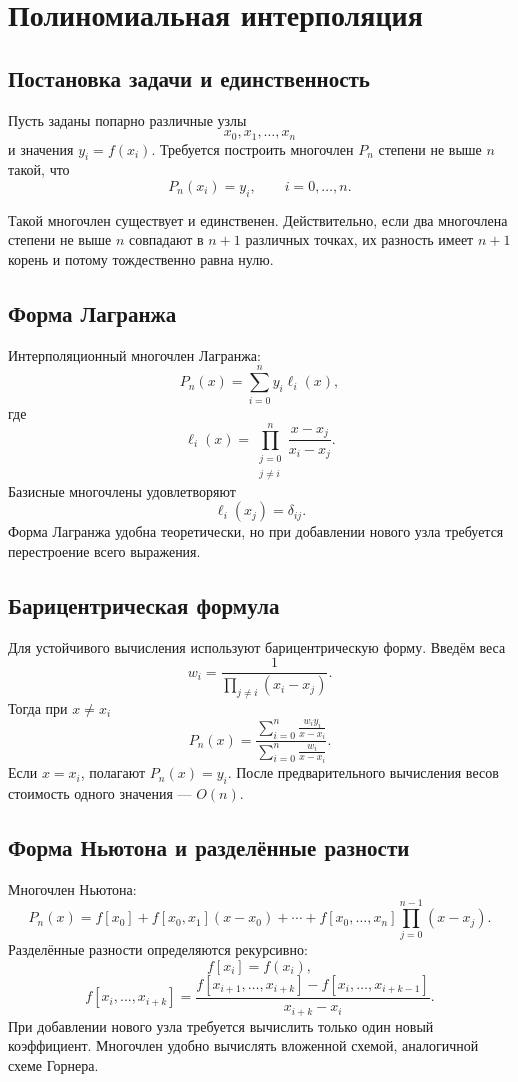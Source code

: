 \section{Полиномиальная интерполяция}
\label{sec:polynomial-interpolation}

\subsection{Постановка задачи и единственность}

Пусть заданы попарно различные узлы
\[
    x_0,x_1,\ldots,x_n
\]
и значения $y_i=f(x_i)$. Требуется построить многочлен $P_n$ степени не выше
$n$ такой, что
\[
    P_n(x_i)=y_i,
    \qquad i=0,\ldots,n.
\]

Такой многочлен существует и единственен. Действительно, если два многочлена
степени не выше $n$ совпадают в $n+1$ различных точках, их разность имеет
$n+1$ корень и потому тождественно равна нулю.

\subsection{Форма Лагранжа}

Интерполяционный многочлен Лагранжа:
\[
    P_n(x)=\sum_{i=0}^{n}y_i\ell_i(x),
\]
где
\[
    \ell_i(x)=
    \prod_{\substack{j=0\\j\neq i}}^{n}
    \frac{x-x_j}{x_i-x_j}.
\]
Базисные многочлены удовлетворяют
\[
    \ell_i(x_j)=\delta_{ij}.
\]
Форма Лагранжа удобна теоретически, но при добавлении нового узла требуется
перестроение всего выражения.

\subsection{Барицентрическая формула}

Для устойчивого вычисления используют барицентрическую форму. Введём веса
\[
    w_i=\frac{1}{\prod_{j\neq i}(x_i-x_j)}.
\]
Тогда при $x\neq x_i$
\[
    P_n(x)=
    \frac{\displaystyle\sum_{i=0}^{n}\frac{w_i y_i}{x-x_i}}
         {\displaystyle\sum_{i=0}^{n}\frac{w_i}{x-x_i}}.
\]
Если $x=x_i$, полагают $P_n(x)=y_i$. После предварительного вычисления весов
стоимость одного значения --- $O(n)$.

\subsection{Форма Ньютона и разделённые разности}

Многочлен Ньютона:
\[
P_n(x)=f[x_0]
+f[x_0,x_1](x-x_0)
+\cdots+
 f[x_0,\ldots,x_n]\prod_{j=0}^{n-1}(x-x_j).
\]
Разделённые разности определяются рекурсивно:
\[
    f[x_i]=f(x_i),
\]
\[
    f[x_i,\ldots,x_{i+k}]
    =
    \frac{f[x_{i+1},\ldots,x_{i+k}]-f[x_i,\ldots,x_{i+k-1}]}
         {x_{i+k}-x_i}.
\]
При добавлении нового узла требуется вычислить только один новый коэффициент.
Многочлен удобно вычислять вложенной схемой, аналогичной схеме Горнера.

